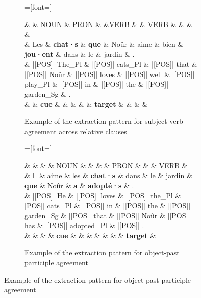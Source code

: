 \begin{figure}[!ht]
  \centering
  \begin{subfigure}[b]{\textwidth}
    \centering
    \begin{dependency}
      =[font=\fontsize{9}{11}\selectfont]
      \begin{deptext}
       \& \& NOUN \& PRON \&  \&VERB  \& \& VERB \&  \&  \&  \&    \\
        \& Les \& {\bf chat·s} \& {\bf que} \& Noûr \& aime \& bien \& {\bf jou·ent} \& dans \& le \& jardin \& . \\
       \& |[POS]| The\_Pl \& |[POS]| cats\_Pl \& |[POS]| that \& |[POS]| Noûr \& |[POS]| loves \& |[POS]| well \& |[POS]| play\_Pl \& |[POS]| in \& |[POS]| the \& |[POS]| garden\_Sg \& . \\
       \& \& {\bf cue} \&  \&  \&  \& \& {\bf target} \&  \&  \&  \&    \\
      \end{deptext}
    \end{dependency}
    \caption{Example of the extraction pattern for subject-verb agreement across relative clauses}
    \label{fig:ex-subj-v_extraction}
  \end{subfigure}
  
  \vspace{0.5cm}
  
  \begin{subfigure}[b]{\textwidth}
    \centering
    \begin{dependency}
      =[font=\fontsize{9}{11}\selectfont]
      \begin{deptext}
        \& \&  \&   \& NOUN \&  \&   \&  \& PRON \&  \&  \& VERB  \&  \\
       \& Il \& aime \&  les \& {\bf chat·s} \& dans \&  le \& jardin \& {\bf que}  \& Noûr \& {\bf a} \& {\bf adopté·s}  \& . \\
       \& |[POS]| He \& |[POS]| loves \& |[POS]| the\_Pl \& |[POS]| cats\_Pl \& |[POS]| in \& |[POS]| the \& |[POS]| garden\_Sg \& |[POS]| that \& |[POS]| Noûr \& |[POS]| has \& |[POS]| adopted\_Pl \& |[POS]| . \\
       \& \&  \&   \& {\bf cue} \&  \&   \&  \&  \&  \&  \& {\bf target}  \&  \\
      \end{deptext}
    \end{dependency}
    \caption{Example of the extraction pattern for object-past participle agreement  }
    \label{fig:ex-obj-pp_extraction}
  \end{subfigure}
  \end{figure}
